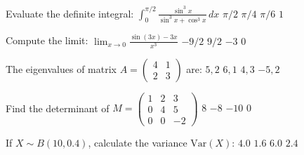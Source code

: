 \documentclass{article}
\begin{document}

\begin{question}
Evaluate the definite integral: $\int_0^{\pi/2} \frac{\sin^3 x}{\sin^3 x + \cos^3 x} \, dx$
  \choice $\pi / 2$
  \CorrectChoice $\pi / 4$
  \choice $\pi / 6$
  \choice $1$
\end{question}

\begin{question}
Compute the limit: $\lim_{x \to 0} \frac{\sin(3x) - 3x}{x^3}$
  \CorrectChoice $-9/2$
  \choice $9/2$
  \choice $-3$
  \choice $0$
\end{question}

\begin{question}
The eigenvalues of matrix $A = \begin{pmatrix} 4 & 1 \\ 2 & 3 \end{pmatrix}$ are:
  \CorrectChoice $5, 2$
  \choice $6, 1$
  \choice $4, 3$
  \choice $-5, 2$
\end{question}

\begin{question}
Find the determinant of $M = \begin{pmatrix} 1 & 2 & 3 \\ 0 & 4 & 5 \\ 0 & 0 & -2 \end{pmatrix}$
  \choice $8$
  \CorrectChoice $-8$
  \choice $-10$
  \choice $0$
\end{question}

\begin{question}
If $X \sim B(10, 0.4)$, calculate the variance $\mathrm{Var}(X)$:
  \choice $4.0$
  \choice $1.6$
  \choice $6.0$
  \CorrectChoice $2.4$
\end{question}
\end{document}
